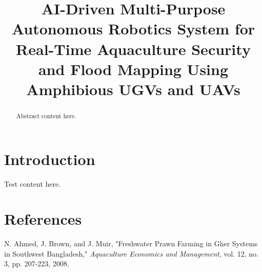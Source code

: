\documentclass[conference]{IEEEtran}
\begin{document}
\title{AI-Driven Multi-Purpose Autonomous Robotics System for Real-Time Aquaculture Security and Flood Mapping Using Amphibious UGVs and UAVs}

\author{
}

\maketitle

\begin{abstract}
Abstract content here.
\end{abstract}

\section{Introduction}
Test content here.

\section*{References}
\begin{thebibliography}{99}

 N. Ahmed, J. Brown, and J. Muir, "Freshwater Prawn Farming in Gher Systems in Southwest Bangladesh," \textit{Aquaculture Economics and Management}, vol. 12, no. 3, pp. 207-223, 2008.

\end{thebibliography}
\end{document}
